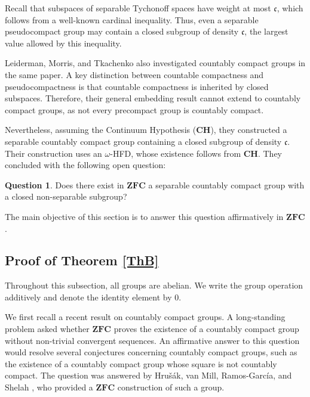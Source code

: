 \documentclass[12pt]{amsart}
\theoremstyle{definition}
\newtheorem{question}[theorem]{Question}
\numberwithin{equation}{section}
\theoremstyle{remark}
\begin{document}
Recall that subspaces of separable Tychonoff spaces have weight at most $\mathfrak{c}$, which follows from a well-known cardinal inequality. Thus, even a separable pseudocompact group may contain a closed subgroup of density $\mathfrak{c}$, the largest value allowed by this inequality.

Leiderman, Morris, and Tkachenko also investigated countably compact groups in the same paper. A key distinction between countable compactness and pseudocompactness is that countable compactness is inherited by closed subspaces. Therefore, their general embedding result cannot extend to countably compact groups, as not every precompact group is countably compact.

Nevertheless, assuming the Continuum Hypothesis ($\mathbf{CH}$), they constructed a separable countably compact group containing a closed subgroup of density $\mathfrak{c}$. Their construction uses an $\omega$-HFD, whose existence follows from $\mathbf{CH}$. They concluded with the following open question:

\begin{question}\cite[Question 5.6]{LMT}
Does there exist in $\mathbf{ZFC}$ a separable countably compact group with a closed non-separable subgroup?
\end{question}

The main objective of this section is to answer this question affirmatively in $\mathbf{ZFC}$.

\subsection{Proof of Theorem \ref{ThB}}
Throughout this subsection, all groups are abelian. We write the group operation additively and denote the identity element by $0$.

We first recall a recent result on countably compact groups. A long-standing problem asked whether $\mathbf{ZFC}$ proves the existence of a countably compact group without non-trivial convergent sequences.
An affirmative answer to this question would resolve several conjectures concerning countably compact groups, such as the existence of a countably compact group whose square is not countably compact. The question was answered by Hru\v{s}\'{a}k, van Mill, Ramos-Garc\'{i}a, and Shelah \cite{HMRS}, who provided a $\mathbf{ZFC}$ construction of such a group.
\end{document}
